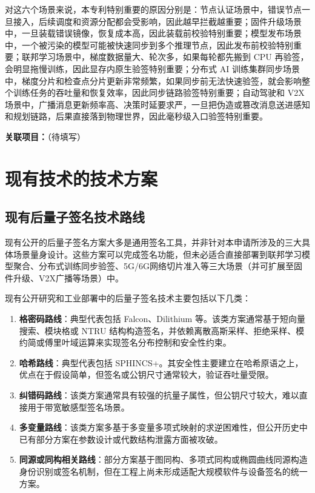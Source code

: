 \documentclass[12pt,a4paper]{article}
\begin{document}
对这六个场景来说，本专利特别重要的原因分别是：节点认证场景中，错误节点一旦接入，后续调度和资源分配都会受影响，因此越早拦截越重要；固件升级场景中，一旦装载错误镜像，恢复成本高，因此装载前校验特别重要；模型发布场景中，一个被污染的模型可能被快速同步到多个推理节点，因此发布前校验特别重要；联邦学习场景中，梯度数据量大、轮次多，如果每轮都先搬到 CPU 再验签，会明显拖慢训练，因此显存内原生验签特别重要；分布式 AI 训练集群同步场景中，梯度分片和检查点分片更新非常频繁，如果同步前无法快速验签，就会影响整个训练任务的吞吐量和恢复效率，因此同步链路验签特别重要；自动驾驶和 V2X 场景中，广播消息更新频率高、决策时延要求严，一旦把伪造或篡改消息送进感知和规划链路，后果直接落到物理世界，因此毫秒级入口验签特别重要。

\textbf{关联项目：}\underline{\hspace{8cm}}（待填写）

\section{现有技术的技术方案}

\subsection{现有后量子签名技术路线}

现有公开的后量子签名方案大多是通用签名工具，并非针对本申请所涉及的三大具体场景量身设计。这些方案可以完成签名功能，但未必适合直接部署到联邦学习模型聚合、分布式训练同步验签、5G/6G网络切片准入等三大场景（并可扩展至固件升级、V2X广播等场景）中。

现有公开研究和工业部署中的后量子签名技术主要包括以下几类：

\begin{enumerate}
    \item \textbf{格密码路线}：典型代表包括 Falcon、Dilithium 等。该类方案通常基于短向量搜索、模块格或 NTRU 结构构造签名，并依赖离散高斯采样、拒绝采样、模约简或傅里叶域运算来实现签名分布控制和安全性约束。
    \item \textbf{哈希路线}：典型代表包括 SPHINCS+。其安全性主要建立在哈希原语之上，优点在于假设简单，但签名或公钥尺寸通常较大，验证吞吐量受限。
    \item \textbf{纠错码路线}：该类方案通常具有较强的抗量子属性，但公钥尺寸较大，难以直接用于带宽敏感型签名场景。
    \item \textbf{多变量路线}：该类方案多基于多变量多项式映射的求逆困难性，但公开历史中已有部分方案在参数设计或代数结构泄露方面被攻破。
    \item \textbf{同源或同构相关路线}：部分方案基于图同构、多项式同构或椭圆曲线同源构造身份识别或签名机制，但在工程上尚未形成适配大规模软件与设备签名的统一方案。
\end{enumerate}
\end{document}
